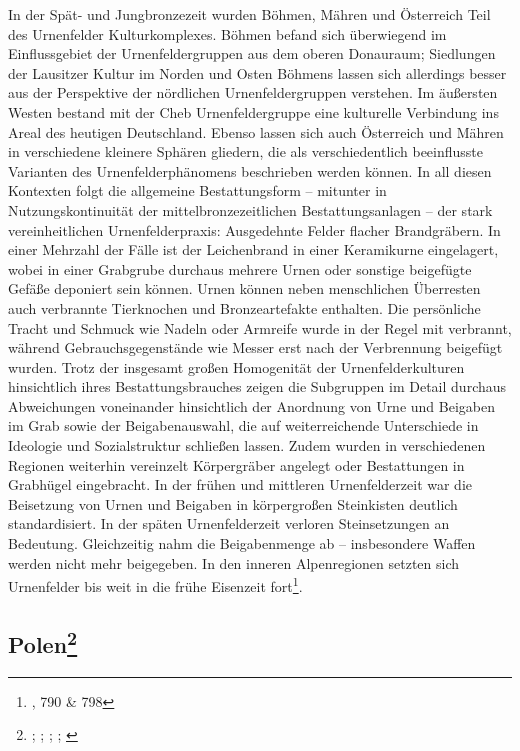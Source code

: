 \documentclass[openany,twoside,twocolumn]{book}
\let\rmarkdownfootnote\footnote%
\def\footnote{\protect\rmarkdownfootnote}
\begin{document}
In der Spät- und Jungbronzezeit wurden Böhmen, Mähren und Österreich Teil des Urnenfelder Kulturkomplexes. Böhmen befand sich überwiegend im Einflussgebiet der Urnenfeldergruppen aus dem oberen Donauraum; Siedlungen der Lausitzer Kultur im Norden und Osten Böhmens lassen sich allerdings besser aus der Perspektive der nördlichen Urnenfeldergruppen verstehen. Im äußersten Westen bestand mit der Cheb Urnenfeldergruppe eine kulturelle Verbindung ins Areal des heutigen Deutschland. Ebenso lassen sich auch Österreich und Mähren in verschiedene kleinere Sphären gliedern, die als verschiedentlich beeinflusste Varianten des Urnenfelderphänomens beschrieben werden können. In all diesen Kontexten folgt die allgemeine Bestattungsform -- mitunter in Nutzungskontinuität der mittelbronzezeitlichen Bestattungsanlagen -- der stark vereinheitlichen Urnenfelderpraxis: Ausgedehnte Felder flacher Brandgräbern. In einer Mehrzahl der Fälle ist der Leichenbrand in einer Keramikurne eingelagert, wobei in einer Grabgrube durchaus mehrere Urnen oder sonstige beigefügte Gefäße deponiert sein können. Urnen können neben menschlichen Überresten auch verbrannte Tierknochen und Bronzeartefakte enthalten. Die persönliche Tracht und Schmuck wie Nadeln oder Armreife wurde in der Regel mit verbrannt, während Gebrauchsgegenstände wie Messer erst nach der Verbrennung beigefügt wurden. Trotz der insgesamt großen Homogenität der Urnenfelderkulturen hinsichtlich ihres Bestattungsbrauches zeigen die Subgruppen im Detail durchaus Abweichungen voneinander hinsichtlich der Anordnung von Urne und Beigaben im Grab sowie der Beigabenauswahl, die auf weiterreichende Unterschiede in Ideologie und Sozialstruktur schließen lassen. Zudem wurden in verschiedenen Regionen weiterhin vereinzelt Körpergräber angelegt oder Bestattungen in Grabhügel eingebracht. In der frühen und mittleren Urnenfelderzeit war die Beisetzung von Urnen und Beigaben in körpergroßen Steinkisten deutlich standardisiert. In der späten Urnenfelderzeit verloren Steinsetzungen an Bedeutung. Gleichzeitig nahm die Beigabenmenge ab -- insbesondere Waffen werden nicht mehr beigegeben. In den inneren Alpenregionen setzten sich Urnenfelder bis weit in die frühe Eisenzeit fort\footnote{\textcite{lubos_czech_2013}, 790 \& 798}.

\hypertarget{polen}{%
\subsection[Polen]{\texorpdfstring{Polen\footnote{\textcite{dabrowski_aeltere_2004}; \textcite{czebreszuk_bronze_2013}; \textcite{czebreszuk_northeast_2003}; \textcite{machnik_fruhbronzezeit_1977}; \textcite{muller_bruszczewo_2004}}}{Polen}}\label{polen}}
\end{document}
